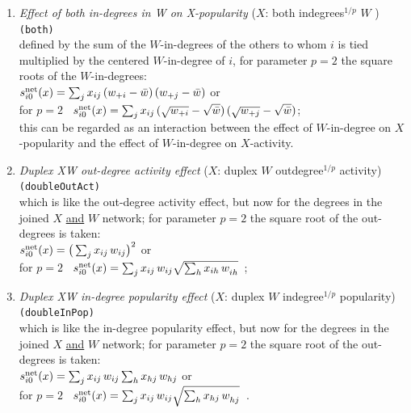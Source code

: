 \documentclass[a4paper,fleqn,11pt]{article}
\newcommand{\+}{\, + \,}
\newcommand{\vit}{\theenumi}
\newcounter{savenumi}
\begin{document}
\begin{enumerate}
 \item {\em Effect of both in-degrees in W on X-popularity } ($X$: both indegrees$^{1/p}$ $W$ ) \texttt{(both)}\\
 defined by   the sum of  the $W$-in-degrees of the others to whom $i$ is tied
 multiplied by the centered $W$-in-degree of $i$,
 for parameter $p = 2$ the square roots of the $W$-in-degrees:\\[0.2em]
 $s^{\rm net}_{i\vit}(x) =
   \sum_j x_{ij}\, ({w_{+i}} - {\bar w}) \, ({w_{+j}} - {\bar w})  $ or\\[0.2em]
for $p=2$ \  $s^{\rm net}_{i\vit}(x) =  \sum_j x_{ij}\,
 (\sqrt{w_{+i}} - \sqrt{\bar w}) \, (\sqrt{w_{+j}} - \sqrt{\bar w})  $;\\[0.2em]
 this can be regarded as an interaction between the effect of $W$-in-degree on $X$-popularity
 and the effect of $W$-in-degree on $X$-activity.

 \item {\em Duplex XW out-degree activity effect } ($X$: duplex $W$ outdegree$^{1/p}$ activity)\\
    \texttt{(doubleOutAct)}\\
  which is like the out-degree activity effect, but now for the degrees in the
  joined $X$ \underline{and} $W$ network;
 for parameter $p = 2$ the square root of the out-degrees is taken:\\[0.4em]
 $s^{\rm net}_{i\vit}(x) =  \big(\sum_j x_{ij}\,w_{ij} \big)^2  $ or\\[0.4em]
for $p=2$ \  $s^{\rm net}_{i\vit}(x) =
        \sum_j x_{ij}\,w_{ij} \sqrt{\sum_h x_{ih}\,w_{ih}^{\phantom{0}} }  $\ ;\\

 \item {\em Duplex XW in-degree popularity effect } ($X$: duplex $W$ indegree$^{1/p}$ popularity)\\
    \texttt{(doubleInPop)}\\
  which is like the in-degree popularity effect, but now for the degrees in the
  joined $X$ \underline{and} $W$ network;
 for parameter $p = 2$ the square root of the out-degrees is taken:\\[0.4em]
 $s^{\rm net}_{i\vit}(x) =  \sum_j x_{ij}\,w_{ij}\sum_h x_{hj}\,w_{hj}   $ or\\[0.4em]
for $p=2$ \  $s^{\rm net}_{i\vit}(x) =
        \sum_j x_{ij}\,w_{ij} \sqrt{\sum_h x_{hj}\,w_{hj}^{\phantom{0}} }  $\ .\\

\setcounter{savenumi}{\value{enumi}}
\end{enumerate}
\end{document}
